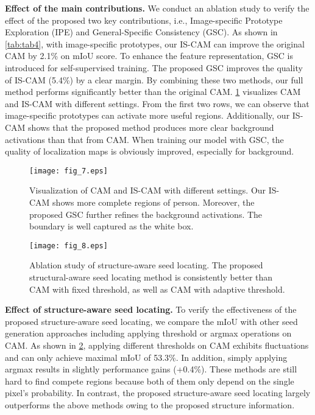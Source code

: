 \documentclass[10pt,twocolumn,letterpaper]{article}
\begin{document}
\textbf{Effect of the main contributions.}
We conduct an ablation study to verify the effect of the proposed two key contributions, i.e., Image-specific Prototype Exploration (IPE) and General-Specific Consistency (GSC).
As shown in \cref{tab:tab4}, with image-specific prototypes, our IS-CAM can improve the original CAM by 2.1\% on mIoU score.
To enhance the feature representation, GSC is introduced for self-supervised training.
The proposed GSC improves the quality of IS-CAM (5.4\%) by a clear margin.
By combining these two methods, our full method performs significantly better than the original CAM.
\cref{fig:fig7} visualizes CAM and IS-CAM with different settings.
From the first two rows, we can observe that image-specific prototypes can activate more useful regions.
Additionally, our IS-CAM shows that the proposed method produces more clear background activations than that from CAM.
When training our model with GSC, the quality of localization maps is obviously improved, especially for background.

\begin{figure}[t]
\centering
\texttt{[image: fig\_7.eps]}
\caption{Visualization of CAM and IS-CAM with different settings. Our IS-CAM shows more complete regions of person. Moreover, the proposed GSC further refines the background activations. The boundary is well captured as the white box.}
\label{fig:fig7}
\end{figure}


\begin{figure}[t]
    \centering
    \texttt{[image: fig\_8.eps]}
    \caption{Ablation study of structure-aware seed locating. The proposed structural-aware seed locating method is consistently better than CAM with fixed threshold, as well as CAM with adaptive threshold.}
    \label{fig:fig8}
\end{figure}

\textbf{Effect of structure-aware seed locating.}
To verify the effectiveness of the proposed structure-aware seed locating, we compare the mIoU with other seed generation approaches including applying threshold or argmax operations on CAM.
As shown in \cref{fig:fig8}, applying different thresholds on CAM exhibits fluctuations and can only achieve maximal mIoU of 53.3\%.
In addition, simply applying argmax results in slightly performance gains (+0.4\%).
These methods are still hard to find compete regions because both of them only depend on the single pixel's probability.
In contrast, the proposed structure-aware seed locating largely outperforms the above methods owing to the proposed structure information.
\end{document}

